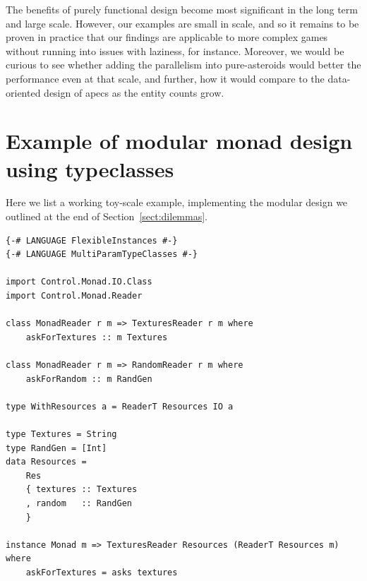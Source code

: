 \documentclass[
  digital, %
  color,   %
  table,   %
  oneside, %
  lof,     %
  lot,     %
]{fithesis3}
\begin{document}
{The benefits of purely functional design become most significant in the long term and large scale.
However, our examples are small in scale, and so it remains to be proven
in practice that our findings are applicable to more complex games
without running into issues with laziness, for instance.
Moreover, we would be curious to see whether adding the parallelism into pure-asteroids
would better the performance even at that scale, and further,
how it would compare to the data-oriented design of apecs as the entity counts grow.





\printbibliography[heading=bibintoc] %






\appendix %

\chapter{Example of modular monad design using typeclasses}
\label{app:classes}

Here we list a working toy-scale example, implementing the modular design
we outlined at the end of Section~\ref{sect:dilemmas}.

\begin{verbatim}
{-# LANGUAGE FlexibleInstances #-}
{-# LANGUAGE MultiParamTypeClasses #-}

import Control.Monad.IO.Class
import Control.Monad.Reader

class MonadReader r m => TexturesReader r m where
    askForTextures :: m Textures

class MonadReader r m => RandomReader r m where
    askForRandom :: m RandGen

type WithResources a = ReaderT Resources IO a

type Textures = String
type RandGen = [Int]
data Resources =
    Res
    { textures :: Textures
    , random   :: RandGen
    }

instance Monad m => TexturesReader Resources (ReaderT Resources m) where
    askForTextures = asks textures


\end{verbatim}}
\end{document}

